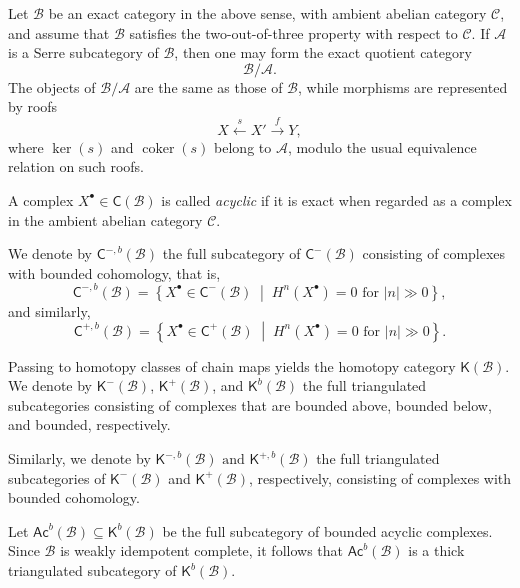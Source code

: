 \documentclass[11pt]{article}
\theoremstyle{definition}
\theoremstyle{remark}
\begin{document}
Let \(\mathcal{B}\) be an exact category in the above sense, with ambient abelian category \(\mathcal{C}\), and assume that \(\mathcal{B}\) satisfies the two-out-of-three property with respect to \(\mathcal{C}\). If \(\mathcal{A}\) is a Serre subcategory of \(\mathcal{B}\), then one may form the exact quotient category \[ \mathcal{B}/\mathcal{A}. \] The objects of \(\mathcal{B}/\mathcal{A}\) are the same as those of \(\mathcal{B}\), while morphisms are represented by roofs \[ X \xleftarrow{s} X' \xrightarrow{f} Y, \] where \(\ker(s)\) and \(\operatorname{coker}(s)\) belong to \(\mathcal{A}\), modulo the usual equivalence relation on such roofs.
\medskip 

A complex \(X^\bullet\in\mathsf{C}(\mathcal{B})\) is called \emph{acyclic} if it is exact when regarded as a complex in the ambient abelian category \(\mathcal{C}\).

We denote by
\( 
\mathsf{C}^{-,b}(\mathcal{B})
\)
the full subcategory of \(\mathsf{C}^{-}(\mathcal{B})\) consisting of complexes with bounded cohomology, that is,
\[
\mathsf{C}^{-,b}(\mathcal{B})
=
\left\{
X^\bullet\in\mathsf{C}^{-}(\mathcal{B})
\;\middle|\;
H^n(X^\bullet)=0
\text{ for } |n|\gg 0
\right\},
\]
and similarly,
\[
\mathsf{C}^{+,b}(\mathcal{B})
=
\left\{
X^\bullet\in\mathsf{C}^{+}(\mathcal{B})
\;\middle|\;
H^n(X^\bullet)=0
\text{ for } |n|\gg 0
\right\}.
\]

Passing to homotopy classes of chain maps yields the homotopy category
\(\mathsf{K}(\mathcal{B})\). We denote by
\(\mathsf{K}^{-}(\mathcal{B})\),
\(\mathsf{K}^{+}(\mathcal{B})\), and
\(\mathsf{K}^{b}(\mathcal{B})\)
the full triangulated subcategories consisting of complexes that are bounded above, bounded below, and bounded, respectively.

Similarly, we denote by
\( 
\mathsf{K}^{-,b}(\mathcal{B})
\,\,\text{and}\,\, 
\mathsf{K}^{+,b}(\mathcal{B})
\)
the full triangulated subcategories of
\(\mathsf{K}^{-}(\mathcal{B})\) and
\(\mathsf{K}^{+}(\mathcal{B})\),
respectively, consisting of complexes with bounded cohomology.

Let
\( 
\mathsf{Ac}^{b}(\mathcal{B})
\subseteq
\mathsf{K}^{b}(\mathcal{B})
\)
be the full subcategory of bounded acyclic complexes. Since \(\mathcal{B}\) is weakly idempotent complete, it follows that
\(\mathsf{Ac}^{b}(\mathcal{B})\)
is a thick triangulated subcategory of
\(\mathsf{K}^{b}(\mathcal{B})\).
\end{document}
